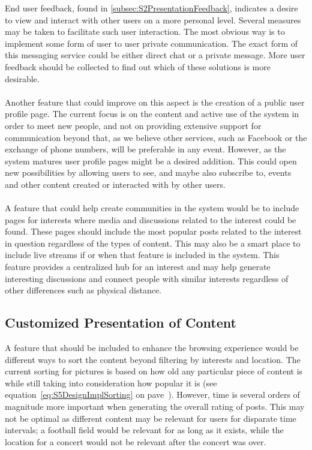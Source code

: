 End user feedback, found in \ref{subsec:S2PresentationFeedback}, indicates a desire to view and interact with other users on a more personal level. Several measures may be taken to facilitate such user interaction. The most obvious way is to implement some form of user to user private communication. The exact form of this messaging service could be either direct chat or a private message. More user feedback should be collected to find out which of these solutions is more desirable.
\paragraph{} Another feature that could improve on this aspect is the creation of a public user profile page. The current focus is on the content and active use of the system in order to meet new people, and not on providing extensive support for communication beyond that, as we believe other services, such as Facebook or the exchange of phone numbers, will be preferable in any event. However, as the system matures user profile pages might be a desired addition. This could open new possibilities by allowing users to see, and maybe also subscribe to, events and other content created or interacted with by other users.
\paragraph{} A feature that could help create communities in the system would be to include pages for interests where media and discussions related to the interest could be found. These pages should include the most popular posts related to the interest in question regardless of the types of content. This may also be a smart place to include live streams if or when that feature is included in the system. This feature provides a centralized hub for an interest and may help generate interesting discussions and connect people with similar interests regardless of other differences such as physical distance. %

\subsection{Customized Presentation of Content}
\label{subsec:FurtherImprovementsCustomized}

A feature that should be included to enhance the browsing experience would be different ways to sort the content beyond filtering by interests and location. The current sorting for pictures is based on how old any particular piece of content is while still taking into consideration how popular it is (see equation~\ref{eq:S5DesignImplSorting} on pave~\pageref{eq:S5DesignImplSorting}). However, time is several orders of magnitude more important when generating the overall rating of posts. This may not be optimal as different content may be relevant for users for disparate time intervals; a football field would be relevant for as long as it exists, while the location for a concert would not be relevant after the concert was over.
